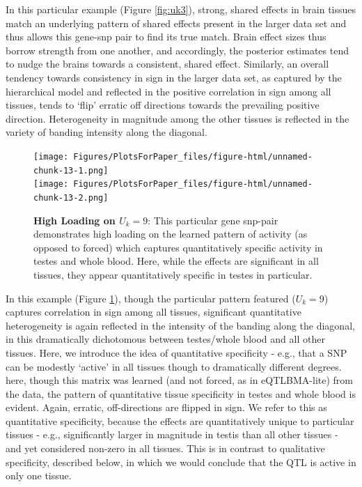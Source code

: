 In this particular example (Figure \ref{fig:uk3}), strong, shared effects in brain tissues match an underlying pattern of shared effects present in the larger data set and thus allows this gene-snp pair to find its true match. Brain effect sizes thus borrow strength from one another, and accordingly, the posterior estimates tend to nudge the brains towards a consistent, shared effect. Similarly, an overall tendency towards consistency in sign in the larger data set, as captured by the hierarchical model and reflected in the positive correlation in sign among all tissues, tends to `flip' erratic off directions towards the prevailing positive direction. Heterogeneity in magnitude among the other tissues is reflected in the variety of banding intensity along the diagonal.\newline


\newline
\begin{figure}[htbp]
\texttt{[image: Figures/PlotsForPaper\_files/figure-html/unnamed-chunk-13-1.png]}\\
\texttt{[image: Figures/PlotsForPaper\_files/figure-html/unnamed-chunk-13-2.png]}
\caption{\textbf{High Loading on $U_{k}=9$}: This particular gene snp-pair demonstrates high loading on the learned pattern of activity (as opposed to forced) which captures quantitatively specific activity in testes and whole blood. Here, while the effects are significant in all tissues, they appear quantitatively specific in testes in particular.}
\label{fig:uk9}
\end{figure}\newline


In this example (Figure \ref{fig:uk9}), though the particular pattern featured ($U_{k}=9$) captures correlation in sign among all tissues, significant quantitative heterogeneity is again reflected in the intensity of the banding along the diagonal, in this dramatically dichotomous between testes/whole blood and all other tissues. Here, we introduce the idea of quantitative specificity - e.g., that a SNP can be modestly `active' in all tissues though to dramatically different degrees. here, though this matrix was learned (and not forced, as in eQTLBMA-lite) from the data, the pattern of quantitative tissue specificity in testes and whole blood is evident. Again, erratic, off-directions are flipped in sign. We refer to this as quantitative specificity, because the effects are quantitatively unique to particular tissues - e.g., significantly larger in magnitude in testis than all other tissues - and yet considered non-zero in all tissues. This is in contrast to qualitative specificity, described below, in which we would conclude that the QTL is active in only one tissue. \newline




